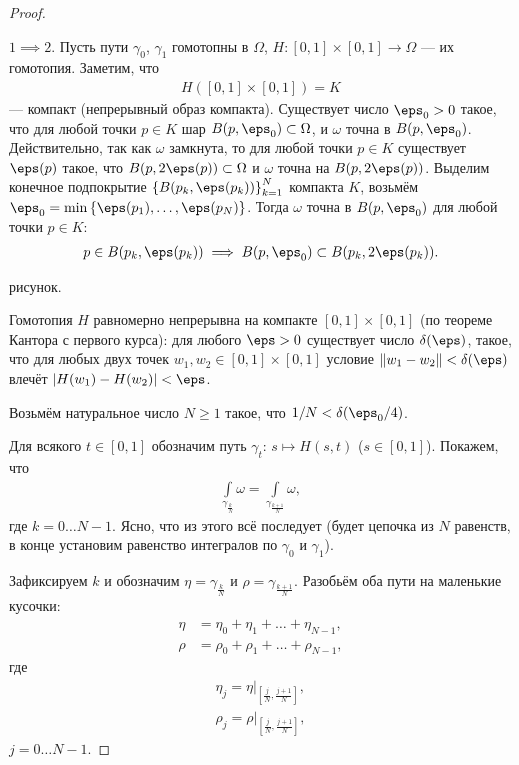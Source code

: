 \begin{proof}\

 $1 \implies 2$. Пусть пути $\gamma_0$, $\gamma_1$ гомотопны в $\Omega$, $H \colon [0,1] \times [0,1] \to \Omega$ --- их гомотопия. Заметим, что
 \begin{align*}
  H([0,1] \times [0,1]) = K
 \end{align*}  --- компакт (непрерывный образ компакта). Существует число $\eps_0 > 0$ такое, что для любой точки $p \in K$ шар $B(p,\eps_0) \subset \Omega$, и $\omega$ точна в $B(p,\eps_0)$. Действительно, так как $\omega$ замкнута, то для любой точки $p \in K$ существует $\eps(p)$ такое, что $B(p,2\eps(p))\subset\Omega$ и $\omega$ точна на $B(p,2\eps(p))$. Выделим конечное подпокрытие $\left\{ B(p_k, \eps(p_k)) \right\}_{k=1}^{N}$ компакта $K$, возьмём $\eps_0 = \min \left\{ \eps(p_1), \ldots, \eps(p_N) \right\}$. Тогда $\omega$ точна в $B(p,\eps_0)$ для любой точки $p \in K$:
 \begin{align*}
  p \in B(p_k,\eps(p_k)) \implies B(p,\eps_0) \subset B(p_k,2\eps(p_k))
 .\end{align*} 
	
 {\color{red} рисунок.}

 Гомотопия $H$ равномерно непрерывна на компакте $[0,1]\times[0,1]$ (по теореме Кантора с первого курса): для любого $\eps > 0$ существует число $\delta(\eps)$, такое, что для любых двух точек $w_1,w_2 \in [0,1] \times [0,1]$ условие $\left\| w_1 - w_2 \right\| < \delta(\eps)$ влечёт $\left| H(w_1)-H(w_2) \right| < \eps$.

 Возьмём натуральное число $N \geqslant 1$ такое, что $1 / N < \delta(\eps_0 / 4)$.

 Для всякого $t \in [0,1]$ обозначим путь $\gamma_t \colon\, s \mapsto H(s,t)$ ($s \in [0,1]$). Покажем, что
 \begin{align*}
  \int\limits_{\gamma_{\frac{k}{N}}}  \omega = \int\limits_{\gamma_{\frac{k+1}{N}}}  \omega,
 \end{align*} где $k = 0 \ldots N - 1$. Ясно, что из этого всё последует (будет цепочка из $N$ равенств, в конце установим равенство интегралов по $\gamma_0$ и $\gamma_1$).

 Зафиксируем $k$ и обозначим $\eta = \gamma_{\frac{k}{N}}$  и $\rho = \gamma_{\frac{k+1}{N}}$. Разобьём оба пути на маленькие кусочки:
 \begin{align*}
  \eta &= \eta_0 + \eta_1 + \ldots + \eta_{N-1}, \\
  \rho &= \rho_0 + \rho_1 + \ldots + \rho_{N-1},
 \end{align*} где
 \begin{align*}
  \eta_j = \eta \rvert_{\left[\frac{j}{N},\frac{j+1}{N}\right]  }, \\
  \rho_j = \rho \rvert_{\left[\frac{j}{N},\frac{j+1}{N}\right]  },
 \end{align*} $j = 0 \ldots N - 1$.


\end{proof}

